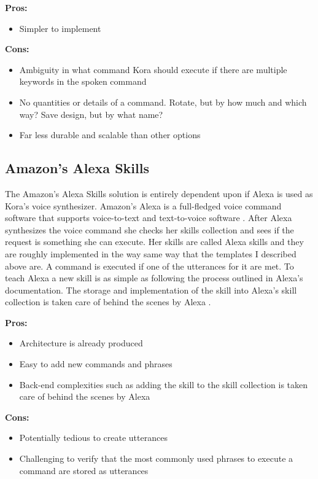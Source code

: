 \documentclass[onecolumn, draftclsnofoot,10pt, compsoc]{IEEEtran}
\begin{document}
					\textbf{Pros:}
						\begin{itemize}
							\item{
								Simpler to implement}
						\end{itemize}
					
					\textbf{Cons:}
						\begin{itemize}
							\item{
								Ambiguity in what command Kora should execute if there are multiple keywords in the spoken command}
							\item{
								No quantities or details of a command. Rotate, but by how much and which way? Save design, but by what name? }
							\item{
								Far less durable and scalable than other options}
						\end{itemize}
				
				
			\subsection{Amazon's Alexa Skills}
				The Amazon's Alexa Skills solution is entirely dependent upon if Alexa is used as Kora's voice synthesizer.
				Amazon's Alexa is a full-fledged voice command software that supports voice-to-text and text-to-voice software .
				After Alexa synthesizes the voice command she checks her skills collection and sees if the request is something she can execute.
				Her skills are called Alexa skills and they are roughly implemented in the way same way that the templates I described above are.
				A command is executed if one of the utterances for it are met.
				To teach Alexa a new skill is as simple as following the process outlined in Alexa's documentation.
				The storage and implementation of the skill into Alexa's skill collection is taken care of behind the scenes by Alexa \cite{alexaSkills}.
				
				\textbf{Pros:}
					\begin{itemize}
						\item{
						Architecture is already produced}
					\item{
						Easy to add new commands and phrases}
					\item{
						Back-end complexities such as adding the skill to the skill collection is taken care of behind the scenes by Alexa}
					\end{itemize}
				
				\textbf{Cons:}
					\begin{itemize}
						\item{
							Potentially tedious to create utterances}
						\item{
							Challenging to verify that the most commonly used phrases to execute a command are stored as utterances}
					\end{itemize}
	
\end{document}
